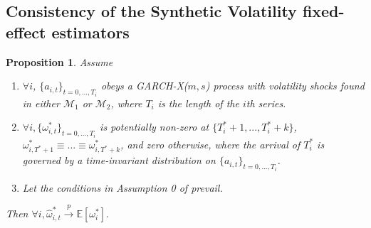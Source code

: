 \documentclass[11pt]{article}
\def\mc#1{\mathcal{#1}} %
\def\E{\mathbb{E}} %
\def\mc#1{\mathcal{#1}}
\newtheorem{prop}{Proposition}
\theoremstyle{definition}
\newenvironment{proof-of-proposition}[1][{}]{\noindent{\bf
    Proof of Proposition {#1}}
  \hspace*{.5em}}{\qed\bigskip\\}
\begin{document}

\subsection{Consistency of the Synthetic Volatility fixed-effect estimators}

\begin{prop}\label{consistency} Assume
\begin{enumerate}
  \item $\forall i$, $\{a_{i,t}\}_{t=0,...,T_i}$ obeys a GARCH-X($m,s$) process with volatility shocks found in either $\mc{M}_1$ or $\mc{M}_2$, where $T_i$ is the length of the $i$th series.
  \item $\forall i, \{\omega_{i,t}^{*}\}_{t=0,...,T_i}$ is potentially non-zero at $\{T^{*}_{i}+1,... ,T^{*}_{i}+k\}$, $\omega_{i,T^{*}+1}^{*}\equiv...\equiv\omega_{i,T^{*}+k}^{*}$, and zero otherwise, where the arrival of $T_{i}^{*}$ is governed by a time-invariant distribution on $\{a_{i,t}\}_{t=0,...,T_i}$. \label{stationarity_of_omega_i_t}
  \item Let the conditions in Assumption 0 of \citet{han2014asymptotic} prevail.
\end{enumerate}
Then $\forall i, \hat\omega_{i,t}^{*} \xrightarrow{p} \E[\omega_{i}^{*}].$
\end{prop}
\end{document}
